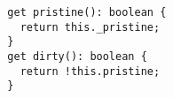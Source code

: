 \begin{verbatim}
  get pristine(): boolean {
    return this._pristine;
  }
  get dirty(): boolean {
    return !this.pristine;
  }
\end{verbatim}
